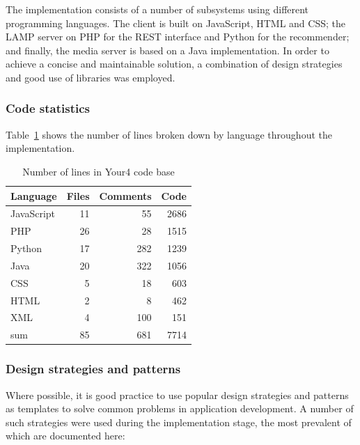The implementation consists of a number of subsystems using different programming languages. The client is built on JavaScript, HTML and CSS; the LAMP server on PHP for the REST interface and Python for the recommender; and finally, the media server is based on a Java implementation. In order to achieve a concise and maintainable solution, a combination of design strategies and good use of libraries was employed.

\subsubsection{Code statistics}
\label{sec:implementation_code_stats}
Table~\ref{tab:metrics} shows the number of lines broken down by language throughout the implementation.
\nopagebreak
\begin{table}[H]
	\centering
	\begin{tabular}{l r r r}
		\toprule
		\textbf{Language} & \textbf{Files} & \textbf{Comments} & \textbf{Code} \\
		\midrule
		JavaScript & 11 & 55 & 2686 \\ 
		PHP & 26 & 28 & 1515 \\ 
		Python & 17 & 282 & 1239 \\ 
		Java & 20 & 322 & 1056 \\ 
		CSS & 5 & 18 & 603 \\ 
		HTML & 2 & 8 & 462 \\ 
		XML & 4 & 100 & 151 \\ 
		\midrule
		sum & 85 & 681 & 7714 \\ 
		\bottomrule
	\end{tabular}
	\caption{Number of lines in Your4 code base}
	\label{tab:metrics}
\end{table}

\subsubsection{Design strategies and patterns}

Where possible, it is good practice to use popular design strategies and patterns as templates to solve common problems in application development. A number of such strategies were used during the implementation stage, the most prevalent of which are documented here:

